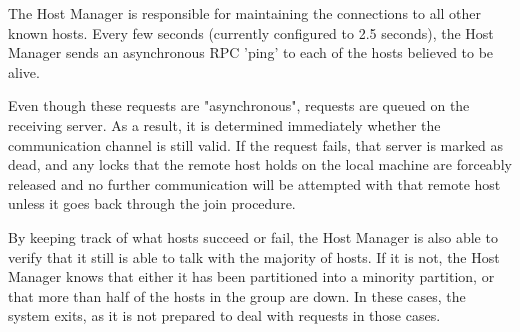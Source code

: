 The Host Manager is responsible for maintaining the connections to all other
known hosts. Every few seconds (currently configured to 2.5 seconds), the Host
Manager sends an asynchronous RPC 'ping' to each of the hosts believed to be
alive.

Even though these requests are "asynchronous", requests are queued on the
receiving server. As a result, it is determined immediately whether the
communication channel is still valid. If the request fails, that server is
marked as dead, and any locks that the remote host holds on the local machine
are forceably released and no further communication will be attempted with that
remote host unless it goes back through the join procedure.

By keeping track of what hosts succeed or fail, the Host Manager is also able to
verify that it still is able to talk with the majority of hosts. If it is not,
the Host Manager knows that either it has been partitioned into a minority
partition, or that more than half of the hosts in the group are down. In these
cases, the system exits, as it is not prepared to deal with requests in those
cases.

